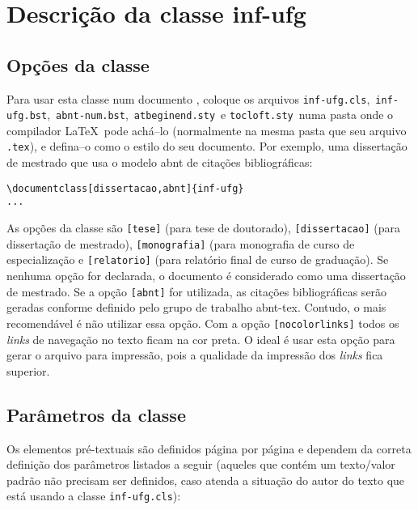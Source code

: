 \chapter{Descrição da classe \textsf{inf-ufg}}
\label{cap:descr}

\section{Opções da classe}
\label{sec:opcoes}
Para usar esta classe num documento \LaTeXe, coloque os arquivos 
\verb|inf-ufg.cls|,\ \verb|inf-ufg.bst|,\ \verb|abnt-num.bst|,\ \verb|atbeginend.sty|\ e \verb|tocloft.sty|\ numa pasta onde o compilador \LaTeX\ pode achá--lo (normalmente na mesma pasta que seu arquivo \verb|.tex|), e defina--o como o estilo do seu documento. Por exemplo, uma dissertação de mestrado que usa o modelo abnt de citações bibliográficas:
\begin{verbatim}
\documentclass[dissertacao,abnt]{inf-ufg}
...

\end{verbatim}

As opções da classe são \verb|[tese]| (para tese de doutorado), \verb|[dissertacao]| (para dissertação de mestrado), \verb|[monografia]| (para monografia de curso de especialização e \verb|[relatorio]| (para relatório final de curso de graduação). Se nenhuma opção for declarada, o documento é considerado como uma dissertação de mestrado. Se a opção \verb|[abnt]| for utilizada, as citações bibliográficas serão geradas conforme definido pelo grupo de trabalho \textsf{abnt-tex}. Contudo, o mais recomendável é não utilizar essa opção. Com a opção \verb|[nocolorlinks]| todos os {\em links} de navegação no texto ficam na cor preta. O ideal é usar esta opção para gerar o arquivo para impressão, pois a qualidade da impressão dos {\em links} fica superior.


\section{Parâmetros da classe}
\label{sec:param}
Os elementos pré-textuais são definidos página por página e dependem da correta definição dos parâmetros listados a seguir (aqueles que contém um texto/valor padrão não precisam ser definidos, caso atenda a situação do autor do texto que está usando a classe \verb|inf-ufg.cls|):

